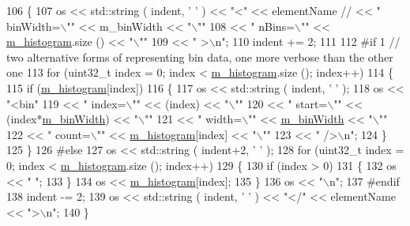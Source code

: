 \begin{DoxyCode}
106 \{
107   os << std::string ( indent, \textcolor{charliteral}{' '} ) << \textcolor{stringliteral}{"<"} << elementName \textcolor{comment}{// << " binWidth=\(\backslash\)"" << m\_binWidth << "\(\backslash\)""}
108      << \textcolor{stringliteral}{" nBins=\(\backslash\)""} << \hyperlink{classns3_1_1Histogram_a4e84e8b2f18d8dd6c23bc55ea8c18c4a}{m\_histogram}.size () << \textcolor{stringliteral}{"\(\backslash\)""}
109      << \textcolor{stringliteral}{" >\(\backslash\)n"};
110   indent += 2;
111 
112 \textcolor{preprocessor}{#if 1 // two alternative forms of representing bin data, one more verbose than the other one}
113   \textcolor{keywordflow}{for} (uint32\_t index = 0; index < \hyperlink{classns3_1_1Histogram_a4e84e8b2f18d8dd6c23bc55ea8c18c4a}{m\_histogram}.size (); index++)
114     \{
115       \textcolor{keywordflow}{if} (\hyperlink{classns3_1_1Histogram_a4e84e8b2f18d8dd6c23bc55ea8c18c4a}{m\_histogram}[index])
116         \{
117           os << std::string ( indent, \textcolor{charliteral}{' '} );
118           os << \textcolor{stringliteral}{"<bin"}
119              << \textcolor{stringliteral}{" index=\(\backslash\)""} << (index) << \textcolor{stringliteral}{"\(\backslash\)""}
120              << \textcolor{stringliteral}{" start=\(\backslash\)""} << (index*\hyperlink{classns3_1_1Histogram_a6c8752ed3fce033a0d5d96eb52944c6f}{m\_binWidth}) << \textcolor{stringliteral}{"\(\backslash\)""}
121              << \textcolor{stringliteral}{" width=\(\backslash\)""} << \hyperlink{classns3_1_1Histogram_a6c8752ed3fce033a0d5d96eb52944c6f}{m\_binWidth} << \textcolor{stringliteral}{"\(\backslash\)""}
122              << \textcolor{stringliteral}{" count=\(\backslash\)""} << \hyperlink{classns3_1_1Histogram_a4e84e8b2f18d8dd6c23bc55ea8c18c4a}{m\_histogram}[index] << \textcolor{stringliteral}{"\(\backslash\)""}
123              << \textcolor{stringliteral}{" />\(\backslash\)n"};
124         \}
125     \}
126 \textcolor{preprocessor}{#else}
127   os << std::string ( indent+2, \textcolor{charliteral}{' '} );
128   \textcolor{keywordflow}{for} (uint32\_t index = 0; index < \hyperlink{classns3_1_1Histogram_a4e84e8b2f18d8dd6c23bc55ea8c18c4a}{m\_histogram}.size (); index++)
129     \{
130       \textcolor{keywordflow}{if} (index > 0)
131         \{
132           os << \textcolor{stringliteral}{" "};
133         \}
134       os << \hyperlink{classns3_1_1Histogram_a4e84e8b2f18d8dd6c23bc55ea8c18c4a}{m\_histogram}[index];
135     \}
136   os << \textcolor{stringliteral}{"\(\backslash\)n"};
137 \textcolor{preprocessor}{#endif}
138   indent -= 2;
139   os << std::string ( indent, \textcolor{charliteral}{' '} ) << \textcolor{stringliteral}{"</"} << elementName << \textcolor{stringliteral}{">\(\backslash\)n"};
140 \}
\end{DoxyCode}
